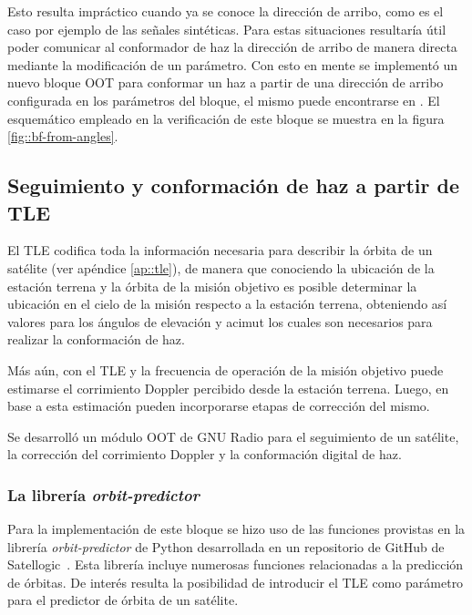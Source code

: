 \documentclass[../../main.tex]{subfiles}
\begin{document}
Esto resulta impráctico cuando ya se conoce la dirección de arribo, como es el caso por ejemplo de las señales sintéticas. Para estas situaciones resultaría útil poder comunicar al conformador de haz la dirección de arribo de manera directa mediante la modificación de un parámetro. Con esto en mente se implementó un nuevo bloque OOT para conformar un haz a partir de una dirección de arribo configurada en los parámetros del bloque, el mismo puede encontrarse en . El esquemático empleado en la verificación de este bloque se muestra en la figura \ref{fig::bf-from-angles}.




\subsection{Seguimiento y conformación de haz a partir de TLE}
El TLE codifica toda la información necesaria para describir la órbita de un satélite (ver apéndice \ref{ap::tle}), de manera que conociendo la ubicación de la estación terrena y la órbita de la misión objetivo es posible determinar la ubicación en el cielo de la misión respecto a la estación terrena, obteniendo así valores para los ángulos de elevación y acimut los cuales son necesarios para realizar la conformación de haz.

Más aún, con el TLE y la frecuencia de operación de la misión objetivo puede estimarse el corrimiento Doppler percibido desde la estación terrena. Luego, en base a esta estimación pueden incorporarse etapas de corrección del mismo.

Se desarrolló un módulo OOT de GNU Radio para el seguimiento de un satélite, la corrección del corrimiento Doppler y la conformación digital de haz.

\subsubsection{La librería \textit{orbit-predictor}}
Para la implementación de este bloque se hizo uso de las funciones provistas en la librería \textit{orbit-predictor} de Python desarrollada en un repositorio de GitHub de Satellogic~\cite{orbit-predictor}. Esta librería incluye numerosas funciones relacionadas a la predicción de órbitas. De interés resulta la posibilidad de introducir el TLE como parámetro para el predictor de órbita de un satélite.
\end{document}

